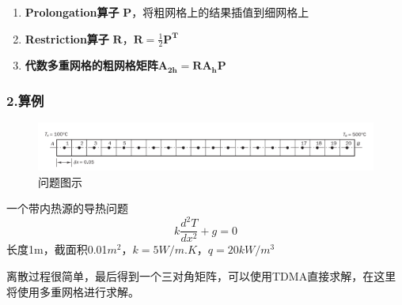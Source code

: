 \documentclass[10pt]{scrartcl}
\begin{document}
\begin{enumerate}[1)]
	\item \textbf{Prolongation算子} $\mathbf{P}$，将粗网格上的结果插值到细网格上	
	\item \textbf{Restriction算子}  $\mathbf{R}$，$\mathbf{R} = \frac{1}{2}\mathbf{P^T}$	
	\item \textbf{代数多重网格的粗网格矩阵}$ \mathbf{A_{2h}} = \mathbf{R}\mathbf{A_h}\mathbf{P}$
\end{enumerate}

\subsubsection{2.算例}

\begin{figure}[H]
	\centering
	\includegraphics[width=0.7\linewidth]{multigrid}
	\caption{问题图示}
	\label{fig:multigrid}
\end{figure}


一个带内热源的导热问题
$$
k\frac{d^2T}{dx^2} + g = 0
$$
长度1m，截面积0.01$m^2$，$k = 5 W/m.K$，$q = 20 kW/m^3$

离散过程很简单，最后得到一个三对角矩阵，可以使用TDMA直接求解，在这里将使用多重网格进行求解。
\end{document}
